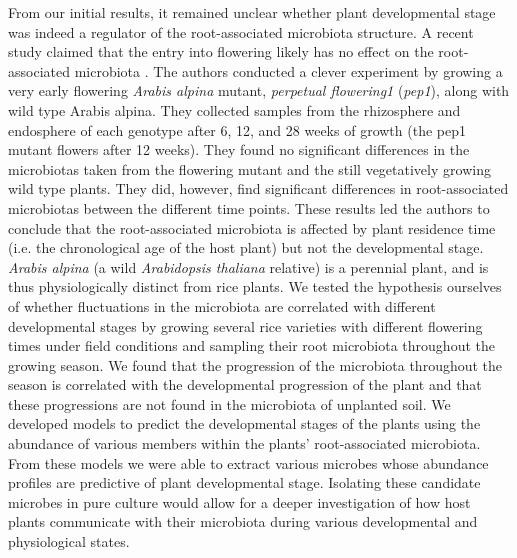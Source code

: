 From our initial results, it remained unclear whether plant developmental stage was indeed a regulator of the root-associated microbiota structure. A recent study claimed that the entry into flowering likely has no effect on the root-associated microbiota \cite{Dombrowski2016}. The authors conducted a clever experiment by growing a very early flowering \textit{Arabis alpina} mutant, \textit{perpetual flowering1} (\textit{pep1})\cite{Wang2009}, along with wild type Arabis alpina. They collected samples from the rhizosphere and endosphere of each genotype after 6, 12, and 28 weeks of growth (the pep1 mutant flowers after 12 weeks). They found no significant differences in the microbiotas taken from the flowering mutant and the still vegetatively growing wild type plants. They did, however, find significant differences in root-associated microbiotas between the different time points. These results led the authors to conclude that the root-associated microbiota is affected by plant residence time (i.e. the chronological age of the host plant) but not the developmental stage. \textit{Arabis alpina} (a wild \textit{Arabidopsis thaliana} relative) is a perennial plant, and is thus physiologically distinct from rice plants. We tested the hypothesis ourselves of whether fluctuations in the microbiota are correlated with different developmental stages by growing several rice varieties with different flowering times under field conditions and sampling their root microbiota throughout the growing season. We found that the progression of the microbiota throughout the season is correlated with the developmental progression of the plant and that these progressions are not found in the microbiota of unplanted soil. We developed models to predict the developmental stages of the plants using the abundance of various members within the plants' root-associated microbiota. From these models we were able to extract various microbes whose abundance profiles are predictive of plant developmental stage. Isolating these candidate microbes in pure culture would allow for a deeper investigation of how host plants communicate with their microbiota during various developmental and physiological states.

